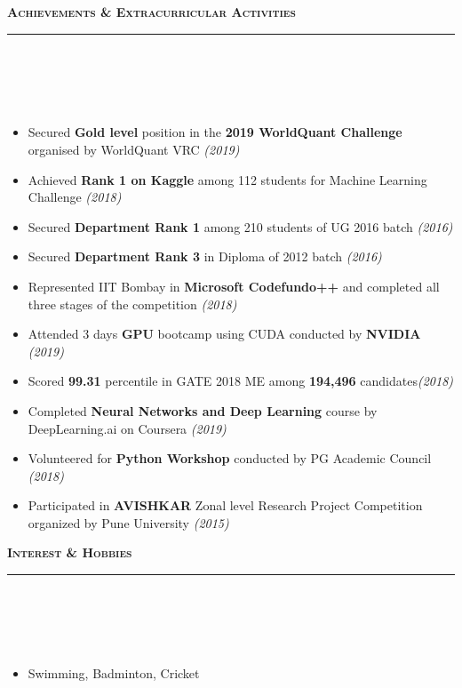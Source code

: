 \documentclass[a4paper,10pt]{article}
\newcommand{\isep}{-2 pt}
\newcommand{\lsep}{-0.5cm}
\newcommand{\resheading}[1]{{\small
        {
            \begin{minipage}
                {0.992\textwidth}\textbf{{\textsc{#1 \vphantom{p\^{E}} }}}
                \\[-0.3cm]
                \hrule
            \end{minipage}
            \\[-0.5cm]
        }
 }}
\begin{document}
\resheading{\textbf{\large Achievements \& Extracurricular Activities}}\\[\lsep]
\\[-0.2cm]
\begin{itemize}\itemsep \isep
     \item Secured \textbf{Gold level} position in the \textbf{2019 WorldQuant Challenge} organised by WorldQuant VRC \hfill\emph{(2019)}
    
    \item Achieved \textbf{Rank 1 on Kaggle} among 112 students for Machine Learning Challenge \hfill\emph{(2018)}
    \item Secured \textbf{Department Rank 1} among 210 students of UG 2016 batch \hfill\emph{(2016)}
    \item Secured \textbf{Department Rank 3} in Diploma of 2012 batch \hfill\emph{(2016)}
    \item Represented IIT Bombay in \textbf{Microsoft Codefundo++} and completed all three stages of the competition \hfill\emph{(2018)}
   \item Attended 3 days \textbf{GPU} bootcamp using CUDA conducted by \textbf{NVIDIA} \hfill\emph{(2019)}
   
    \item Scored \textbf{99.31} percentile in GATE 2018 ME among \textbf{194,496} candidates\hfill\emph{(2018)}

    \item  Completed \textbf{Neural Networks and Deep Learning} course by DeepLearning.ai on Coursera \hfill\emph{(2019)}
    \item Volunteered for \textbf{Python Workshop} conducted by PG Academic Council \hfill\emph{(2018)}
    \item Participated in \textbf{AVISHKAR} Zonal level Research Project Competition organized by Pune University \hfill\emph{(2015)}
\end{itemize}
\resheading{\textbf{\large Interest \& Hobbies}}\\[\lsep] 
\\[-0.2cm]
\begin{itemize}
 \item Swimming, Badminton, Cricket
\end{itemize}
\end{document}
